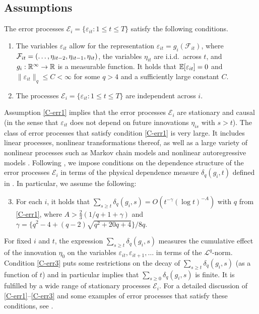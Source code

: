 \documentclass[a4paper,12pt]{article}
\makeatletter
\renewcommand{\eqref}[1]{\tagform@{\ref{#1}}}
\makeatother
\begin{document}
\subsection{Assumptions}\label{subsec:model_assumptions}


The error processes $\mathcal{E}_i = \{ \varepsilon_{it}: 1 \le t \le T\}$ satisfy the following conditions. 
\begin{enumerate}[label=(C\arabic*),leftmargin=1.05cm]
\item \label{C-err1} 
The variables $\varepsilon_{it}$ allow for the representation $\varepsilon_{it} = g_i(\mathcal{F}_{it})$, where $\mathcal{F}_{it} = (\ldots,\eta_{it-2}, \linebreak \eta_{it-1},\eta_{it})$, the variables $\eta_{it}$ are i.i.d.\ across $t$, and $g_i: \mathbb{R}^\infty \rightarrow \mathbb{R}$ is a measurable function. 
It holds that $\mathbb{E}[\varepsilon_{it}] = 0$ and $\| \varepsilon_{it} \|_q \le C < \infty$ for some $q > 4$ and a sufficiently large constant $C$. 
\item \label{C-err2} The processes $\mathcal{E}_i = \{ \varepsilon_{it}: 1 \le t \le T\}$ are independent across $i$.
\end{enumerate}
Assumption \ref{C-err1} implies that the error processes $\mathcal{E}_i$ are stationary and causal (in the sense that $\varepsilon_{it}$ does not depend on future innovations $\eta_{is}$ with $s>t$). The class of error processes that satisfy condition \ref{C-err1} is very large. It includes linear processes, nonlinear transformations thereof, as well as a large variety of nonlinear processes such as Markov chain models and nonlinear autoregressive models \citep[][]{Wu2016}. Following \cite{Wu2005}, we impose conditions on the dependence structure of the error processes $\mathcal{E}_i$ in terms of the physical dependence measure $\delta_q(g_i, t)$ defined in \eqref{eq:physical_dep}. In particular, we assume the following: 
\begin{enumerate}[label=(C\arabic*),leftmargin=1.05cm]
\setcounter{enumi}{2}
\item \label{C-err3} For each $i$, it holds that $\sum\nolimits_{s \ge t} \delta_q(g_i, s) = O ( t^{-\gamma} (\log t)^{-A})$ with $q$ from \ref{C-err1}, where $A > \frac{2}{3} (1/q + 1 + \gamma)$ and $\gamma = \{q^2 - 4 + (q-2) \sqrt{q^2 + 20q + 4}\} / 8q$. 
\end{enumerate}
For fixed $i$ and $t$, the expression $\sum\nolimits_{s \ge t} \delta_q(g_i, s)$ measures the cumulative effect of the innovation $\eta_0$ on the variables $\varepsilon_{it}, \varepsilon_{it+1},\ldots$ in terms of the $\mathcal{L}^q$-norm. Condition \ref{C-err3} puts some restrictions on the decay of $\sum\nolimits_{s \ge t} \delta_q(g_i, s)$ (as a function of $t$) and in particular implies that $\sum\nolimits_{s \ge 0} \delta_q(g_i, s)$ is finite. It is fulfilled by a wide range of stationary processes $\mathcal{E}_i$. For a detailed discussion of \ref{C-err1}--\ref{C-err3} and some examples of error processes that satisfy these conditions, see \cite{KhismatullinaVogt2020}.
\end{document}
